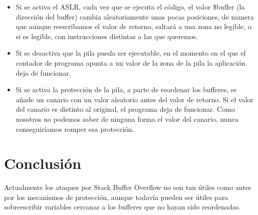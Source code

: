 \documentclass[]{article}
\begin{document}
\begin{itemize} 
	\item Si se activa el ASLR, cada vez que se ejecuta el código, el valor \$buffer (la dirección del buffer) cambia aleatoriamente unas pocas posiciones, de manera que aunque reescribamos el valor de retorno, saltará a una zona no legible, o si es legible, con instrucciones distintas a las que queremos.
	\item Si se desactiva que la pila pueda ser ejecutable, en el momento en el que el contador de programa apunta a un valor de la zona de la pila la aplicación deja de funcionar.
	\item Si se activa la protección de la pila, a parte de reordenar los bufferes, se añade un canario con un valor aleatorio antes del valor de retorno. Si el valor del canario es distinto al original, el programa deja de funcionar. Como nosotros no podemos saber de ninguna forma el valor del canario, nunca conseguiríamos romper esa protección.	
\end{itemize}

\section{Conclusión}

Actualmente los ataques por Stack Buffer Overflow no son tan útiles como antes por los mecanismos de protección, aunque todavía pueden ser útiles para sobreescribir variables cercanas a los bufferes que no hayan sido reordenadas.

\newpage



\end{document}
